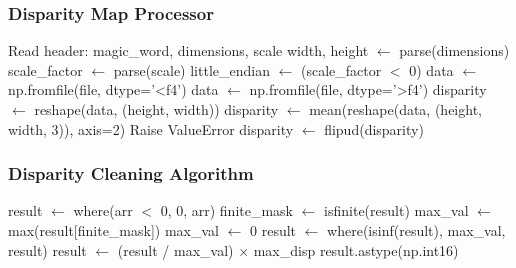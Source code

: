 \documentclass[12pt]{article}
\begin{document}
\subsubsection{Disparity Map Processor}
\begin{algorithm}[H]
\caption{PFM Disparity Map Loading and Cleaning}
\begin{algorithmic}[1]
\State Read header: magic\_word, dimensions, scale
\State width, height $\gets$ parse(dimensions)
\State scale\_factor $\gets$ parse(scale)
\State little\_endian $\gets$ (scale\_factor $<$ 0)
\State {}
    \State data $\gets$ np.fromfile(file, dtype='<f4')
\Else
    \State data $\gets$ np.fromfile(file, dtype='>f4')
\EndIf
\State {}
    \State disparity $\gets$ reshape(data, (height, width))
    \State disparity $\gets$ mean(reshape(data, (height, width, 3)), axis=2)
\Else
    \State Raise ValueError
\EndIf
\State disparity $\gets$ flipud(disparity) 
\State \Return {}
\EndFunction
\end{algorithmic}
\end{algorithm}

\subsubsection{Disparity Cleaning Algorithm}
\begin{algorithm}[H]
\caption{Disparity Map Cleaning and Normalization}
\begin{algorithmic}[1]
\State result $\gets$ where(arr $<$ 0, 0, arr) 
\State finite\_mask $\gets$ isfinite(result)
\State {}
    \State max\_val $\gets$ max(result[finite\_mask])
\Else
    \State max\_val $\gets$ 0
\EndIf
\State result $\gets$ where(isinf(result), max\_val, result) 
\State {}
    \State result $\gets$ (result / max\_val) $\times$ max\_disp 
\EndIf
\State \Return result.astype(np.int16)
\EndFunction
\end{algorithmic}
\end{algorithm}
\end{document}
